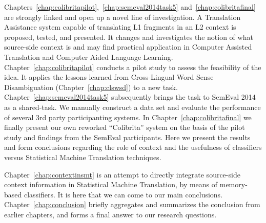 Chapters~\ref{chap:colibritapilot},~\ref{chap:semeval2014task5} and~\ref{chap:colibritafinal}
are strongly linked and open up a novel line of
investigation. A Translation Assistance system capable of translating L1
fragments in an L2 context is proposed, tested, and presented. It changes and
investigates the notion of what source-side context is and may find practical
application in Computer Assisted Translation and Computer Aided Language
Learning. Chapter~\ref{chap:colibritapilot} conducts a pilot study to assess
the feasibility of the idea. It applies the lessons learned from Cross-Lingual
Word Sense Disambiguation (Chapter~\ref{chap:clswsd}) to a new task.
Chapter~\ref{chap:semeval2014task5} subsequently brings the task to SemEval
2014 as a shared-task. We manually construct a data set and evaluate the
performance of several 3rd party participanting systems.
In Chapter~\ref{chap:colibritafinal} we finally present our own reworked
``Colibrita'' system on the basis of the pilot study and findings from the
SemEval participants. Here we present the results and form conclusions
regarding the role of context and the usefulness of classifiers versus
Statistical Machine Translation techniques.

Chapter~\ref{chap:contextinsmt} is an attempt to directly integrate source-side
context information in Statistical Machine Translation, by means of
memory-based classifiers. It is here that we can come to our main conclusions.
Chapter~\ref{chap:conclusion} briefly aggregates and summarizes the
conclusion from earlier chapters, and forms a final answer to our research
questions. 

